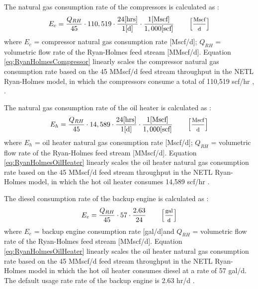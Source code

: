 \documentclass[11pt]{report}
\begin{document}
{The natural gas consumption rate of the compressors is calculated as \cite{NETLRyanHolmesModel}:
\begin{equation} \label{eq:RyanHolmesCompressor}
E_{c}= \frac{Q_{RH}}{45} \cdot 110,519 \cdot \frac{24 [\text{hrs}]}{1 [\text{d}]} \cdot \frac{1 [\text{Mscf}]}{1,000 [\text{scf}]} \quad \quad \begin{footnotesize}\left[ \frac{\text{Mscf}}{\text{d}} \right] \end{footnotesize}
\end{equation}
where $E_{c}$ = compressor natural gas consumption rate [Mscf/d]; $Q_{RH}$ = volumetric flow rate of the Ryan-Holmes feed stream [MMscf/d]. Equation \ref{eq:RyanHolmesCompressor} linearly scales the compressor natural gas consumption rate based on the 45 MMscf/d feed stream throughput in the NETL Ryan-Holmes model, in which the compressors consume a total of 110,519 scf/hr \cite{NETLRyanHolmesModel}, \cite{MilliganRyanHolmesPermit}. 

The natural gas consumption rate of the oil heater is calculated as \cite{NETLRyanHolmesModel}:
\begin{equation} \label{eq:RyanHolmesOilHeater}
E_{h}= \frac{Q_{RH}}{45} \cdot 14,589 \cdot \frac{24 [\text{hrs}]}{1 [\text{d}]} \cdot \frac{1 [\text{Mscf}]}{1,000 [\text{scf}]} \quad \quad \begin{footnotesize}\left[ \frac{\text{Mscf}}{\text{d}} \right] \end{footnotesize}
\end{equation}
where $E_{h}$ = oil heater natural gas consumption rate [Mscf/d]; $Q_{RH}$ = volumetric flow rate of the Ryan-Holmes feed stream [MMscf/d]. Equation \ref{eq:RyanHolmesOilHeater} linearly scales the oil heater natural gas consumption rate based on the 45 MMscf/d feed stream throughput in the NETL Ryan-Holmes model, in which the hot oil heater consumes 14,589 scf/hr \cite{NETLRyanHolmesModel}. 

The diesel consumption rate of the backup engine is calculated as \cite{NETLRyanHolmesModel}:
\begin{equation} \label{eq:RyanHolmesBackupEngine}
E_{e}=\frac{Q_{RH}}{45}\cdot57\cdot\frac{2.63}{24} \quad \quad \begin{footnotesize}\left[ \frac{\text{gal}}{\text{d}} \right] \end{footnotesize}
\end{equation}
where $E_{e}$ = backup engine consumption rate [gal/d]and $Q_{RH}$ = volumetric flow rate of the Ryan-Holmes feed stream [MMscf/d]. Equation \ref{eq:RyanHolmesOilHeater} linearly scales the oil heater natural gas consumption rate based on the 45 MMscf/d feed stream throughput in the NETL Ryan-Holmes model in which the hot oil heater consumes diesel at a rate of 57 gal/d. The default usage rate rate of the backup engine is 2.63 hr/d  \cite{NETLRyanHolmesModel}. 

}
\end{document}

